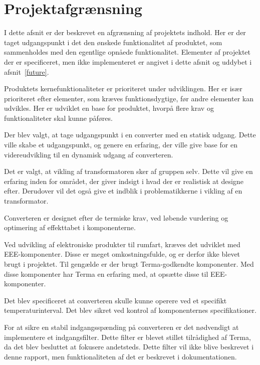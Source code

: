 
\chapter{Projektafgrænsning}
I dette afsnit er der beskrevet en afgrænsning af projektets indhold. Her er der taget udgangspunkt i det den ønskede funktionalitet af produktet, som sammenholdes med den egentlige opnåede funktionalitet. Elementer af projektet der er specificeret, men ikke implementeret er angivet i dette afsnit og uddybet i afsnit~\ref{future}. 

Produktets kernefunktionaliteter er prioriteret under udviklingen. Her er især prioriteret efter elementer, som kræves funktionsdygtige, før andre elementer kan udvikles. Her er udviklet en base for produktet, hvorpå flere krav og funktionaliteter skal kunne påføres.

Der blev valgt, at tage udgangspunkt i en converter med en statisk udgang. Dette ville skabe et udgangspunkt, og genere en erfaring, der ville give base for en videreudvikling til en dynamisk udgang af converteren.  

Det er valgt, at vikling af transformatoren sker af gruppen selv. Dette vil give en erfaring inden for området, der giver indsigt i hvad der er realistisk at designe efter. Derudover vil det også give et indblik i problematikkerne i vikling af en transformator. 

Converteren er designet efter de termiske krav, ved løbende vurdering og optimering af effekttabet i komponenterne.

Ved udvikling af elektroniske produkter til rumfart, kræves det udviklet med EEE-komponenter. Disse er meget omkostningsfulde, og er derfor ikke blevet brugt i projektet. Til gengælde er der brugt Terma-godkendte komponenter. Med disse komponenter har Terma en erfaring med, at opsætte disse til EEE-komponenter.  

Det blev specificeret at converteren skulle kunne operere ved et specifikt temperaturinterval. Det blev sikret ved kontrol af komponenternes specifikationer.

For at sikre en stabil indgangsspænding på converteren er det nødvendigt at implementere et indgangsfilter. Dette filter er blevet stillet tilrådighed af Terma, da det blev besluttet at fokusere andetsteds. Dette filter vil ikke blive beskrevet i denne rapport, men funktionaliteten af det er beskrevet i dokumentationen.




